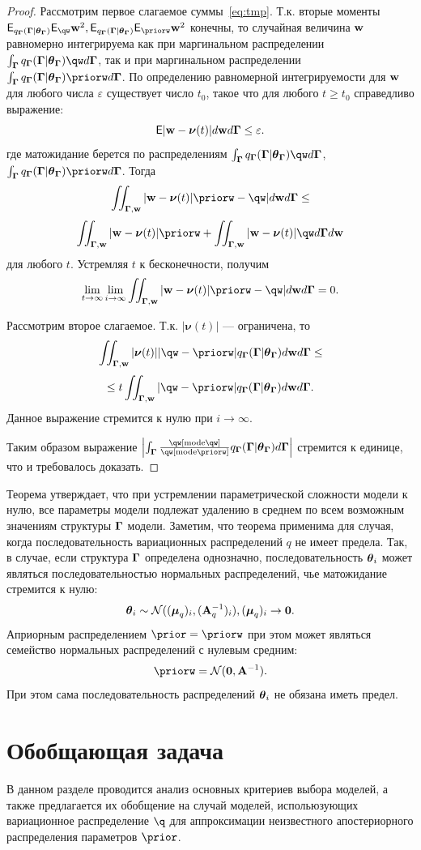 \begin{proof}
Рассмотрим первое слагаемое суммы~\eqref{eq:tmp}. Т.к. вторые моменты $\E_{\qG}\E_{\qw} \w^2, \E_{\qG}\E_{\priorw} \w^2$ конечны, то случайная величина $\mathbf{w}$ равномерно интегрируема как при маргинальном распределении $\int_{\G}\qG\qw d\G$, так и при маргинальном распределении $\int_{\G}\qG\priorw d\G$.
По определению равномерной интегрируемости для $\mathbf{w}$ для любого числа $\varepsilon$ существует число $t_0$, такое что для любого $t \geq t_0$ справедливо выражение:
\[
    \mathsf{E}|\mathbf{w} - \boldsymbol{\nu}(t)| d\mathbf{w} d\boldsymbol{\Gamma} \leq \varepsilon.
\]
где матожидание берется по  распределениям $\int_{\G}\qG\qw d\G$,$\int_{\G}\qG\priorw d\G$. Тогда
\[
   \iint_{\G,\w} |\w -\boldsymbol{\nu}(t)|\priorw  - \qw| d\w d\G   \leq  
\]
\[
  \iint_{\G,\w} |\w -\boldsymbol{\nu}(t)|\priorw  +   \iint_{\G,\w} |\w -\boldsymbol{\nu}(t)|\qw d\G d\w
\]
для любого $t$. Устремляя $t$ к бесконечности, получим $$\lim_{t \to \infty}  \lim_{i \to \infty}    \iint_{\G,\w} |\w -\boldsymbol{\nu}(t)|\priorw  - \qw| d\w d\G = 0.$$

Рассмотрим второе слагаемое. 
Т.к. $|\boldsymbol{\nu}(t)|$ --- ограничена, то 
\[
      \iint_{\G,\w} |\boldsymbol{\nu}(t)| |\qw - \priorw|\qG d\w d\G   \leq
\]
\[
\leq t  \iint_{\G,\w} |\qw - \priorw|\qG d\w d\G.
\]
Данное выражение стремится к нулю при $i \to \infty$.

Таким образом выражение $\left|\int_{\G} \frac{\qw[\text{mode}\qw]}{\qw[\text{mode}\priorw]}\qG d\G \right|$ стремится к единице, что и требовалось доказать.
\end{proof}

Теорема утверждает, что при устремлении параметрической сложности модели к нулю, все параметры модели подлежат удалению в среднем по всем возможным значениям  структуры $\boldsymbol{\Gamma}$ модели. Заметим, что теорема применима для случая, когда последовательность вариационных распределений $q$ не имеет предела. Так, в случае, если структура $\boldsymbol{\Gamma}$ определена однозначно, последовательность $\boldsymbol{\theta}_i$ может являться последовательностью нормальных распределений, чье матожидание стремится к нулю:
\[
    \boldsymbol{\theta}_i \sim \mathcal{N}((\boldsymbol{\mu}_q)_i, (\mathbf{A}^{-1}_q)_i), (\boldsymbol{\mu}_q)_i \to \mathbf{0}.
\]
Априорным распределением $\prior = \priorw$ при этом может являться семейство нормальных распределений с нулевым средним:
\[
    \priorw = \mathcal{N}(\mathbf{0}, \A^{-1}).
\]
При этом сама последовательность распределений $\boldsymbol{\theta}_i$ не обязана иметь предел.

\section{Обобщающая задача}
В данном разделе проводится анализ основных критериев выбора моделей, а также предлагается их обобщение на случай моделей, испольюзующих вариационное распределение $\q$ для аппроксимации неизвестного апостериорного распределения параметров $\prior$.

